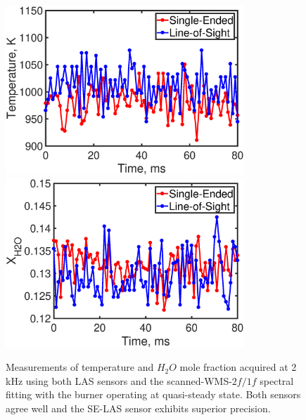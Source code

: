 \begin{figure}[b]
\centering 
\includegraphics[width=0.8\textwidth]{fig/ch4_fig9_2.eps}  
\includegraphics[width=0.8\textwidth]{fig/ch4_fig9_1.eps}  
\caption{Measurements of temperature and $H_2O$ mole fraction acquired at 2 kHz using both LAS sensors and the scanned-WMS-$2f/1f$ spectral fitting with the burner operating at quasi-steady state. Both sensors agree well and the SE-LAS sensor exhibits superior precision.}
    \label{fig:ch4_10}
\end{figure}

